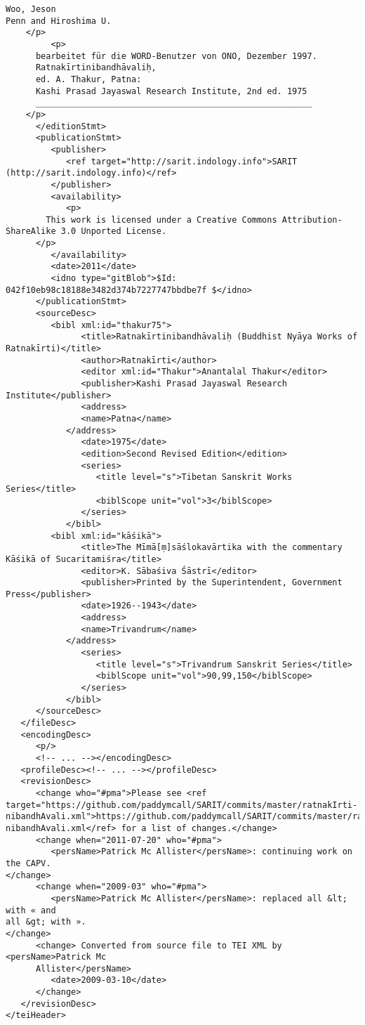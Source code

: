 \documentclass[article,12pt,a4paper]{memoir}
\begin{document}
\begin{verbatim}
Woo, Jeson 
Penn and Hiroshima U.
	</p>
         <p>
	  bearbeitet für die WORD-Benutzer von ONO, Dezember 1997. 
	  Ratnakīrtinibandhāvaliḥ,
	  ed. A. Thakur, Patna:
	  Kashi Prasad Jayaswal Research Institute, 2nd ed. 1975
	  _______________________________________________________
	</p>
      </editionStmt>
      <publicationStmt>
         <publisher>
            <ref target="http://sarit.indology.info">SARIT (http://sarit.indology.info)</ref>
         </publisher>
         <availability>
            <p>
	    This work is licensed under a Creative Commons Attribution-ShareAlike 3.0 Unported License.
	  </p>
         </availability>
         <date>2011</date>
         <idno type="gitBlob">$Id: 042f10eb98c18188e3482d374b7227747bbdbe7f $</idno>
      </publicationStmt>
      <sourceDesc>
         <bibl xml:id="thakur75">
	           <title>Ratnakīrtinibandhāvaliḥ (Buddhist Nyāya Works of Ratnakīrti)</title>
	           <author>Ratnakīrti</author>
	           <editor xml:id="Thakur">Anantalal Thakur</editor>
	           <publisher>Kashi Prasad Jayaswal Research Institute</publisher>
	           <address>
               <name>Patna</name>
            </address>
	           <date>1975</date>
	           <edition>Second Revised Edition</edition>
	           <series>
	              <title level="s">Tibetan Sanskrit Works Series</title>
	              <biblScope unit="vol">3</biblScope>
	           </series>
	        </bibl>
         <bibl xml:id="kāśikā">
	           <title>The Mīmā[ṃ]sāślokavārtika with the commentary Kāśikā of Sucaritamiśra</title>
	           <editor>K. Sābaśiva Śāstrī</editor>
	           <publisher>Printed by the Superintendent, Government Press</publisher>
	           <date>1926--1943</date>
	           <address>
               <name>Trivandrum</name>
            </address>
	           <series>
	              <title level="s">Trivandrum Sanskrit Series</title>
	              <biblScope unit="vol">90,99,150</biblScope>
	           </series>
	        </bibl>
      </sourceDesc>
   </fileDesc>
   <encodingDesc>
      <p/>
      <!-- ... --></encodingDesc>
   <profileDesc><!-- ... --></profileDesc>
   <revisionDesc>
      <change who="#pma">Please see <ref target="https://github.com/paddymcall/SARIT/commits/master/ratnakIrti-nibandhAvali.xml">https://github.com/paddymcall/SARIT/commits/master/ratnakIrti-nibandhAvali.xml</ref> for a list of changes.</change>
      <change when="2011-07-20" who="#pma">
         <persName>Patrick Mc Allister</persName>: continuing work on the CAPV.
</change>
      <change when="2009-03" who="#pma">
         <persName>Patrick Mc Allister</persName>: replaced all &lt; with « and
all &gt; with ».
</change>
      <change> Converted from source file to TEI XML by <persName>Patrick Mc
      Allister</persName> 
         <date>2009-03-10</date>
      </change>
   </revisionDesc>
</teiHeader>
	 \end{verbatim}
       
      \clearpage
      \begin{english}
      \printshorthands
      \printbibliography
      \end{english}
    
\end{document}
